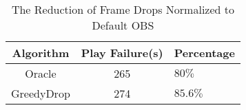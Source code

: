 \begin{table}[tb]
\centering
\caption{The Reduction of Frame Drops Normalized to Default OBS}
\label{tab_drop}
{\setlength{\tabcolsep}{1pt}
\begin{tabular}{|c|c|l|}
\hline
\textbf{Algorithm} &\textbf{Play Failure(s)} & \textbf{Percentage}    \\ \hline
Oracle    &265    &$80\%$           \\ \hline
GreedyDrop  &274  &$85.6\%$              \\ \hline
\end{tabular}}
\vspace{-0.1in}
\end{table}
